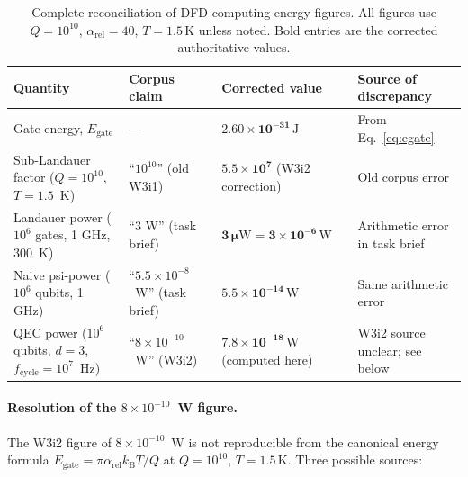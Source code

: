 \documentclass[11pt]{article}
\theoremstyle{definition}
\theoremstyle{remark}
\newcommand{\kB}{k_{\mathrm{B}}}
\newcommand{\arel}{\alpha_{\mathrm{rel}}}
\begin{document}
\begin{table}[h]
\centering
\caption{Complete reconciliation of DFD computing energy figures.
All figures use $Q = 10^{10}$, $\arel = 40$, $T = 1.5\,\mathrm{K}$
unless noted. Bold entries are the corrected authoritative values.}
\label{tab:energy_reconciliation}
\begin{tabular}{@{}p{4.5cm}lll@{}}
\toprule
Quantity & Corpus claim & Corrected value & Source of discrepancy \\
\midrule
Gate energy, $E_{\mathrm{gate}}$ & ---
& $\mathbf{2.60\times10^{-31}\,\mathrm{J}}$
& From Eq.~\eqref{eq:egate} \\
Sub-Landauer factor ($Q=10^{10}$, $T=1.5$~K)
& ``$10^{10}$'' (old W3i1)
& $\mathbf{5.5\times10^7}$ (W3i2 correction)
& Old corpus error \\
Landauer power ($10^6$ gates, 1 GHz, 300~K)
& ``3 W'' (task brief)
& $\mathbf{3\,\mu\mathrm{W} = 3\times10^{-6}\,\mathrm{W}}$
& Arithmetic error in task brief \\
Naive psi-power ($10^6$ qubits, 1 GHz)
& ``$5.5\times10^{-8}$~W'' (task brief)
& $\mathbf{5.5\times10^{-14}\,\mathrm{W}}$
& Same arithmetic error \\
QEC power ($10^6$ qubits, $d=3$, $f_{\mathrm{cycle}}=10^7$~Hz)
& ``$8\times10^{-10}$~W'' (W3i2)
& $\mathbf{7.8\times10^{-18}\,\mathrm{W}}$ (computed here)
& W3i2 source unclear; see below \\
\bottomrule
\end{tabular}
\end{table}

\paragraph{Resolution of the $8\times10^{-10}$~W figure.}
The W3i2 figure of $8\times10^{-10}$~W is not reproducible from the
canonical energy formula $E_{\mathrm{gate}} = \pi\arel\kB T/Q$ at
$Q = 10^{10}$, $T = 1.5\,\mathrm{K}$. Three possible sources:
\end{document}
